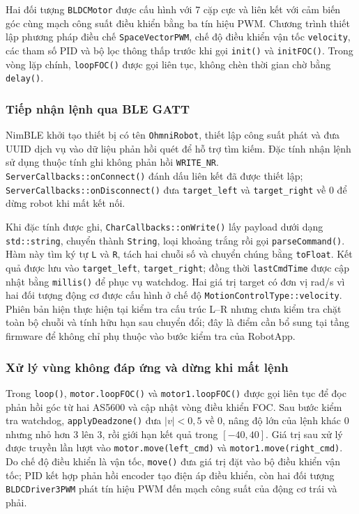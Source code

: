 Hai đối tượng \texttt{BLDCMotor} được cấu hình với 7 cặp cực và liên kết với cảm biến góc cùng mạch công suất điều khiển bằng ba tín hiệu PWM. Chương trình thiết lập phương pháp điều chế \texttt{SpaceVectorPWM}, chế độ điều khiển vận tốc \texttt{velocity}, các tham số PID và bộ lọc thông thấp trước khi gọi \texttt{init()} và \texttt{initFOC()}. Trong vòng lặp chính, \texttt{loopFOC()} được gọi liên tục, không chèn thời gian chờ bằng \texttt{delay()}.

\subsubsection{Tiếp nhận lệnh qua BLE GATT}

NimBLE khởi tạo thiết bị có tên \texttt{OhmniRobot}, thiết lập công suất phát và đưa UUID dịch vụ vào dữ liệu phản hồi quét để hỗ trợ tìm kiếm. Đặc tính nhận lệnh sử dụng thuộc tính ghi không phản hồi \texttt{WRITE\_NR}. \texttt{ServerCallbacks::onConnect()} đánh dấu liên kết đã được thiết lập; \texttt{ServerCallbacks::onDisconnect()} đưa \texttt{target\_left} và \texttt{target\_right} về 0 để dừng robot khi mất kết nối.

Khi đặc tính được ghi, \texttt{CharCallbacks::onWrite()} lấy payload dưới dạng \texttt{std::string}, chuyển thành \texttt{String}, loại khoảng trắng rồi gọi \texttt{parseCommand()}. Hàm này tìm ký tự \texttt{L} và \texttt{R}, tách hai chuỗi số và chuyển chúng bằng \texttt{toFloat}. Kết quả được lưu vào \texttt{target\_left}, \texttt{target\_right}; đồng thời \texttt{lastCmdTime} được cập nhật bằng \texttt{millis()} để phục vụ watchdog. Hai giá trị target có đơn vị rad/s vì hai đối tượng động cơ được cấu hình ở chế độ \texttt{MotionControlType::velocity}. Phiên bản hiện thực hiện tại kiểm tra cấu trúc L--R nhưng chưa kiểm tra chặt toàn bộ chuỗi và tính hữu hạn sau chuyển đổi; đây là điểm cần bổ sung tại tầng firmware để không chỉ phụ thuộc vào bước kiểm tra của RobotApp.

\subsubsection{Xử lý vùng không đáp ứng và dừng khi mất lệnh}

Trong \texttt{loop()}, \texttt{motor.loopFOC()} và \texttt{motor1.loopFOC()} được gọi liên tục để đọc phản hồi góc từ hai AS5600 và cập nhật vòng điều khiển FOC. Sau bước kiểm tra watchdog, \texttt{applyDeadzone()} đưa $|v|<0,5$ về 0, nâng độ lớn của lệnh khác 0 nhưng nhỏ hơn 3 lên 3, rồi giới hạn kết quả trong $[-40,40]$. Giá trị sau xử lý được truyền lần lượt vào \texttt{motor.move(left\_cmd)} và \texttt{motor1.move(right\_cmd)}. Do chế độ điều khiển là vận tốc, \texttt{move()} đưa giá trị đặt vào bộ điều khiển vận tốc; PID kết hợp phản hồi encoder tạo điện áp điều khiển, còn hai đối tượng \texttt{BLDCDriver3PWM} phát tín hiệu PWM đến mạch công suất của động cơ trái và phải.

